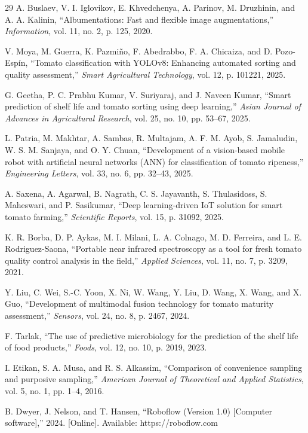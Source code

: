 \documentclass[journal]{IEEEtran}
\begin{document}
\begin{thebibliography}{29}
A. Buslaev, V. I. Iglovikov, E. Khvedchenya, A. Parinov, M. Druzhinin, and A. A. Kalinin, ``Albumentations: Fast and flexible image augmentations,'' \emph{Information}, vol. 11, no. 2, p. 125, 2020.

V. Moya, M. Guerra, K. Pazmi\~no, F. Abedrabbo, F. A. Chicaiza, and D. Pozo-Esp\'in, ``Tomato classification with YOLOv8: Enhancing automated sorting and quality assessment,'' \emph{Smart Agricultural Technology}, vol. 12, p. 101221, 2025.

G. Geetha, P. C. Prabhu Kumar, V. Suriyaraj, and J. Naveen Kumar, ``Smart prediction of shelf life and tomato sorting using deep learning,'' \emph{Asian Journal of Advances in Agricultural Research}, vol. 25, no. 10, pp. 53--67, 2025.

L. Patria, M. Makhtar, A. Sambas, R. Multajam, A. F. M. Ayob, S. Jamaludin, W. S. M. Sanjaya, and O. Y. Chuan, ``Development of a vision-based mobile robot with artificial neural networks (ANN) for classification of tomato ripeness,'' \emph{Engineering Letters}, vol. 33, no. 6, pp. 32--43, 2025.

A. Saxena, A. Agarwal, B. Nagrath, C. S. Jayavanth, S. Thulasidoss, S. Maheswari, and P. Sasikumar, ``Deep learning-driven IoT solution for smart tomato farming,'' \emph{Scientific Reports}, vol. 15, p. 31092, 2025.

K. R. Borba, D. P. Aykas, M. I. Milani, L. A. Colnago, M. D. Ferreira, and L. E. Rodriguez-Saona, ``Portable near infrared spectroscopy as a tool for fresh tomato quality control analysis in the field,'' \emph{Applied Sciences}, vol. 11, no. 7, p. 3209, 2021.

Y. Liu, C. Wei, S.-C. Yoon, X. Ni, W. Wang, Y. Liu, D. Wang, X. Wang, and X. Guo, ``Development of multimodal fusion technology for tomato maturity assessment,'' \emph{Sensors}, vol. 24, no. 8, p. 2467, 2024.

F. Tarlak, ``The use of predictive microbiology for the prediction of the shelf life of food products,'' \emph{Foods}, vol. 12, no. 10, p. 2019, 2023.

I. Etikan, S. A. Musa, and R. S. Alkassim, ``Comparison of convenience sampling and purposive sampling,'' \emph{American Journal of Theoretical and Applied Statistics}, vol. 5, no. 1, pp. 1--4, 2016.

B. Dwyer, J. Nelson, and T. Hansen, ``Roboflow (Version 1.0) [Computer software],'' 2024. [Online]. Available: https://roboflow.com

\end{thebibliography}
\end{document}
